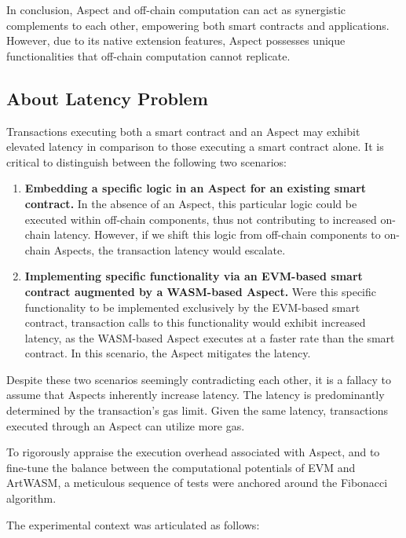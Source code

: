 In conclusion, Aspect and off-chain computation can act as synergistic complements to each other, empowering both smart contracts and applications. However, due to its native extension features, Aspect possesses unique functionalities that off-chain computation cannot replicate.

\subsection{About Latency Problem}

Transactions executing both a smart contract and an Aspect may exhibit elevated latency in comparison to those executing a smart contract alone. It is critical to distinguish between the following two scenarios:

\begin{enumerate}
  \item \textbf{Embedding a specific logic in an Aspect for an existing smart contract.} In the absence of an Aspect, this particular logic could be executed within off-chain components, thus not contributing to increased on-chain latency. However, if we shift this logic from off-chain components to on-chain Aspects, the transaction latency would escalate.
  \item \textbf{Implementing specific functionality via an EVM-based smart contract augmented by a WASM-based Aspect.} Were this specific functionality to be implemented exclusively by the EVM-based smart contract, transaction calls to this functionality would exhibit increased latency, as the WASM-based Aspect executes at a faster rate than the smart contract. In this scenario, the Aspect mitigates the latency.
\end{enumerate}

Despite these two scenarios seemingly contradicting each other, it is a fallacy to assume that Aspects inherently increase latency. The latency is predominantly determined by the transaction's gas limit. Given the same latency, transactions executed through an Aspect can utilize more gas.

To rigorously appraise the execution overhead associated with Aspect, and to fine-tune the balance between the computational potentials of EVM and ArtWASM, a meticulous sequence of tests were anchored around the Fibonacci algorithm.

The experimental context was articulated as follows:

